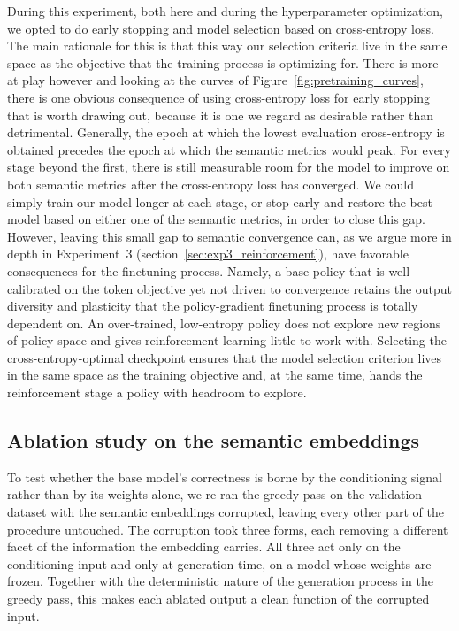 \documentclass[titlepage,a4paper,11pt]{report}
\begin{document}
    During this experiment, both here and during the hyperparameter optimization, we opted to do early stopping and model selection based on cross-entropy loss. The main rationale for this is that this way our selection criteria live in the same space as the objective that the training process is optimizing for. There is more at play however and looking at the curves of Figure~\ref{fig:pretraining_curves}, there is one obvious consequence of using cross-entropy loss for early stopping that is worth drawing out, because it is one we regard as desirable rather than detrimental. Generally, the epoch at which the lowest evaluation cross-entropy is obtained precedes the epoch at which the semantic metrics would peak. For every stage beyond the first, there is still measurable room for the model to improve on both semantic metrics after the cross-entropy loss has converged. We could simply train our model longer at each stage, or stop early and restore the best model based on either one of the semantic metrics, in order to close this gap. However, leaving this small gap to semantic convergence can, as we argue more in depth in Experiment~3 (section~\ref{sec:exp3_reinforcement}), have favorable consequences for the finetuning process. Namely, a base policy that is well-calibrated on the token objective yet not driven to convergence retains the output diversity and plasticity that the policy-gradient finetuning process is totally dependent on. An over-trained, low-entropy policy does not explore new regions of policy space and gives reinforcement learning little to work with. Selecting the cross-entropy-optimal checkpoint ensures that the model selection criterion lives in the same space as the training objective and, at the same time, hands the reinforcement stage a policy with headroom to explore.


    \subsection{Ablation study on the semantic embeddings}\label{sec:exp1_ablation}
    To test whether the base model's correctness is borne by the conditioning signal rather than by its weights alone, we re-ran the greedy pass on the validation dataset with the semantic embeddings corrupted, leaving every other part of the procedure untouched. The corruption took three forms, each removing a different facet of the information the embedding carries. All three act only on the conditioning input and only at generation time, on a model whose weights are frozen. Together with the deterministic nature of the generation process in the greedy pass, this makes each ablated output a clean function of the corrupted input.
    
\end{document}
